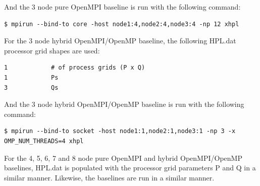 \documentclass{report}
\begin{document}
And the 3 node pure OpenMPI baseline is run with the following command:

\lstset{style=type}
\begin{lstlisting}[]
$ mpirun --bind-to core -host node1:4,node2:4,node3:4 -np 12 xhpl
\end{lstlisting}

For the 3 node hybrid OpenMPI/OpenMP baseline, the following HPL.dat processor grid shapes are used: 

\lstset{style=listing}
\begin{lstlisting}[numbers=none]
1            # of process grids (P x Q)
1            Ps
3            Qs
\end{lstlisting}

And the 3 node hybrid OpenMPI/OpenMP baseline is run with the following command:

\lstset{style=type}
\begin{lstlisting}[]
$ mpirun --bind-to socket -host node1:1,node2:1,node3:1 -np 3 -x OMP_NUM_THREADS=4 xhpl
\end{lstlisting}

For the 4, 5, 6, 7 and 8 node pure OpenMPI and hybrid OpenMPI/OpenMP baselines, HPL.dat is populated with the processor grid parameters P and Q in a similar manner. Likewise, the baselines are run in a similar manner.
\end{document}

